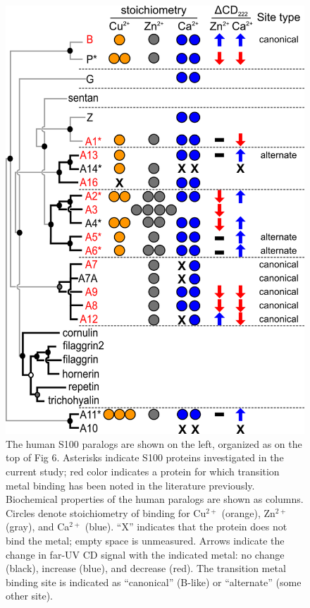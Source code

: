 \begin{figure}
\centering
	\includegraphics{ch3-fig4.png} 
\caption[Transition metal binding is conserved in the S100 family]{The human S100 paralogs are shown on the left, organized as on the top of Fig 6. Asterisks indicate S100 proteins investigated in the current study; red color indicates a protein for which transition metal binding has been noted in the literature previously. Biochemical properties of the human paralogs are shown as columns. Circles denote stoichiometry of binding for Cu$^{2+}$ (orange), Zn$^{2+}$ (gray), and Ca$^{2+}$ (blue). “X” indicates that the protein does not bind the metal; empty space is unmeasured. Arrows indicate the change in far-UV CD signal with the indicated metal: no change (black), increase (blue), and decrease (red). The transition metal binding site is indicated as “canonical” (B-like) or “alternate” (some other site).\label{samplefigure}}	
\end{figure}


